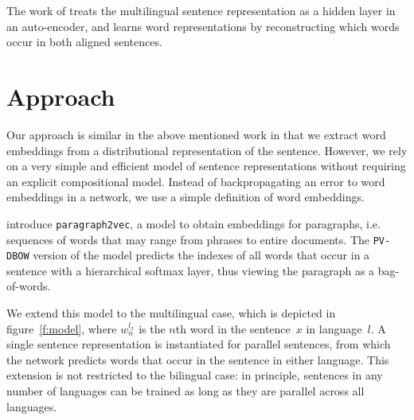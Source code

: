 \documentclass[a4paper,11pt]{article}
\begin{document}
The work of \cite{SarathChandar2014autoencoder} treats the multilingual sentence representation as a hidden layer in an auto-encoder, and learns word representations by reconstructing which words occur in both aligned sentences. 





\section*{Approach}

Our approach is similar in the above mentioned work in that we extract word embeddings from a distributional representation of the sentence. However, we rely on a very simple and efficient model of sentence representations without requiring an explicit compositional model. Instead of backpropagating an error to word embeddings in a network, we use a simple definition of word embeddings. 


\cite{Le2014} introduce {\tt paragraph2vec}, a model to obtain embeddings for paragraphs, i.e. sequences of words that may range from phrases  to entire documents. The {\tt PV-DBOW} version of the model predicts the indexes of all words that occur in a sentence with a hierarchical softmax layer, thus viewing the paragraph as a bag-of-words. 

We extend this model to the multilingual case, which is depicted in figure~\ref{f:model}, where $w_n^{l_x}$ is the $n$th word in the sentence~$x$ in language~$l$. A single sentence representation is instantiated for parallel sentences, from which the network predicts words that occur in the sentence in either language. This extension is not restricted to the bilingual case: in principle, sentences in any number of languages can be trained as long as they are parallel across all languages.
\end{document}
